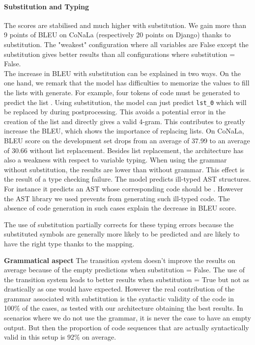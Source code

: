 \documentclass[11pt]{article}
\newcommand{\var}{\sc}
\begin{document}
\paragraph{Substitution and Typing} The scores are stabilised and much higher with substitution. We gain more than 9 points of BLEU on {\selectfont CoNaLa} (respectively 20 points on {\selectfont Django}) thanks to substitution.  The "weakest" configuration where all variables are {\sc False} except the substitution gives better results than all configurations where {\var substitution = False}. \\
The increase in BLEU with substitution can be explained in two ways.
On the one hand, we remark that the model has difficulties to memorize the values to fill the lists with {\sc generate}. For example, four tokens of code must be generated to predict the list \codeword{[a, b, c, d]}. Using substitution, the model can just predict \texttt{lst\_0} which will be replaced by \codeword{[a, b, c, d]} during postprocessing. This avoids a potential error in the creation of the list and directly gives a valid 4-gram. This contributes to greatly increase the BLEU, which shows the importance of replacing lists. On {\selectfont CoNaLa}, BLEU score on the development set drops from an average of 37.99 to an average of 30.66 without list replacement. 
Besides list replacement, the architecture has also a weakness with respect to variable typing. 
When using the grammar without substitution, the results are lower than without grammar.
This effect is the result of a type checking failure. The model predicts ill-typed AST structures. For instance it predicts an AST whose corresponding code should be . However the AST library we used prevents from generating such ill-typed code. The absence of code generation in such cases explain the decrease in BLEU score.

The use of substitution partially corrects for these typing errors because the substituted symbols  are generally more likely to be predicted and are likely to have the right type thanks to the mapping.

{\bf Grammatical aspect} The transition system doesn't improve the results on average because of the empty predictions when {\var substitution = False}. The use of the transition system leads to better results when {\var substitution = True} but not as drastically as one would have expected. 
However the real contribution of the grammar associated with substitution is the syntactic validity of the code in 100\% of the cases, as tested with our architecture obtaining the best results. In scenarios where we do not use the grammar, it is never the case to have an empty output. But then the proportion of code sequences that are actually syntactically valid in this setup is 92\% on average. 
\end{document}
